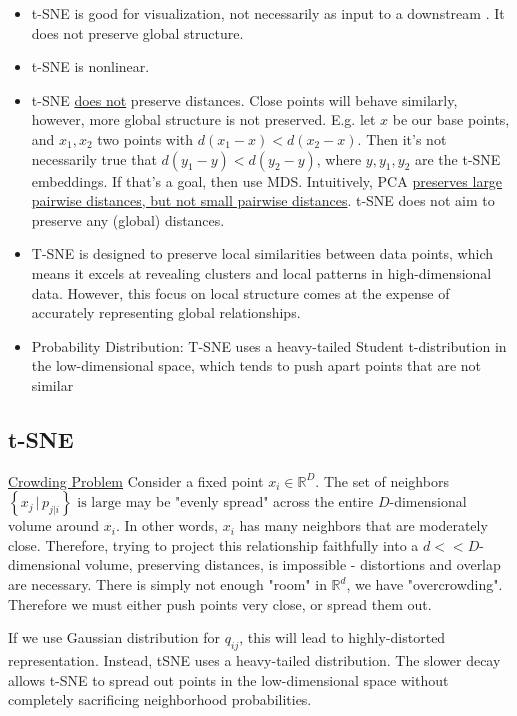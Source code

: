 \documentclass{article}
\begin{document}
\begin{remark} \hphantom{}
\begin{itemize}

  \item t-SNE is good for visualization, not necessarily as input to a downstream . It does not preserve global structure. 
  \item t-SNE is nonlinear.
  \item t-SNE \ul{does not} preserve distances. Close points will behave similarly, however, more global structure is not preserved. E.g. let $x$ be our base points, and $x_1, x_2$ two points with $d(x_1-x) < d(x_2-x)$. Then it's not necessarily true that $d(y_1-y) < d(y_2-y)$, where $y,y_1,y_2$ are the t-SNE embeddings. If that's a goal, then use MDS. Intuitively, PCA \href{https://stats.stackexchange.com/a/176801/213861}{preserves large pairwise distances, but not small pairwise distances}. t-SNE does not aim to preserve any (global) distances. 
  \item T-SNE is designed to preserve local similarities between data points, which means it excels at revealing clusters and local patterns in high-dimensional data. However, this focus on local structure comes at the expense of accurately representing global relationships.
 \item  Probability Distribution: T-SNE uses a heavy-tailed Student t-distribution in the low-dimensional space, which tends to push apart points that are not similar

\end{itemize}
\end{remark}

\subsection{t-SNE}
\ul{Crowding Problem} Consider a fixed point $x_i \in \mathbb{R}^{D}$. The set of neighbors $\left\{ x_j \, | \,  p_{j|i} \right\} \text{ is large}$ may be "evenly spread" across the entire $D$-dimensional volume around $x_i$. In other words, $x_i$ has many neighbors that are moderately close.  Therefore, trying to project this relationship faithfully into a $d << D$-dimensional volume, preserving distances, is impossible - distortions and overlap are necessary. There is simply not enough "room" in $\mathbb{R}^{d}$, we have "overcrowding". Therefore we must either push points very close, or spread them out. 

If we use Gaussian distribution for $q_{ij}$, this will lead to highly-distorted representation. Instead, tSNE uses a heavy-tailed distribution. The slower decay allows t-SNE to spread out points in the low-dimensional space without completely sacrificing neighborhood probabilities.  
\end{document}
